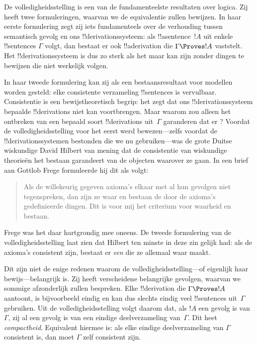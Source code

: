 \documentclass[../../../include/open-logic-section]{subfiles}
\begin{document}
      {}
      {}


De volledigheidsstelling is een van de fundamenteelste resultaten over
logica. Zij heeft twee formuleringen, waarvan we de equivalentie zullen
bewijzen. In haar eerste formulering zegt zij iets fundamenteels over
de verhouding tussen semantisch gevolg en ons !!{derivation}ssysteem:
als !!a{sentence}~$!A$ uit enkele !!{sentence}s $\Gamma$ volgt, dan
bestaat er ook !!a{derivation} die $\Gamma \Proves !A$ vaststelt. Het
!!{derivation}ssysteem is dus zo sterk als het maar kan zijn zonder
dingen te bewijzen die niet werkelijk volgen.

In haar tweede formulering kan zij als een bestaansresultaat voor
modellen worden gesteld: elke consistente verzameling !!{sentence}s is
vervulbaar. Consistentie is een bewijstheoretisch begrip: het zegt dat
ons !!{derivation}ssysteem bepaalde !!{derivation}s niet kan
voortbrengen. Maar waarom zou alleen het ontbreken van een bepaald
soort !!{derivation}s uit~$\Gamma$ garanderen dat er
? Voordat de
volledigheidsstelling voor het eerst werd bewezen---zelfs voordat de
!!{derivation}ssystemen bestonden die we nu gebruiken---was de grote
Duitse wiskundige David Hilbert van mening dat de consistentie van
wiskundige theorieën het bestaan garandeert van de objecten waarover
ze gaan. In een brief aan Gottlob Frege formuleerde hij dit als volgt:
\begin{quote}
  Als de willekeurig gegeven axioma's elkaar met al hun gevolgen niet
  tegenspreken, dan zijn ze waar en bestaan de door de axioma's
  gedefinieerde dingen. Dit is voor mij het criterium voor waarheid en
  bestaan.
\end{quote}
Frege was het daar hartgrondig mee oneens. De tweede formulering van de
volledigheidsstelling laat zien dat Hilbert ten minste in deze zin
gelijk had: als de axioma's consistent zijn, bestaat er \emph{een}
 die ze allemaal waar maakt.

Dit zijn niet de enige redenen waarom de volledigheidsstelling---of
eigenlijk haar bewijs---belangrijk is. Zij heeft verscheidene
belangrijke gevolgen, waarvan we sommige afzonderlijk zullen
bespreken. Elke !!{derivation} die $\Gamma \Proves !A$ aantoont, is
bijvoorbeeld eindig en kan dus slechts eindig veel !!{sentence}s
uit~$\Gamma$ gebruiken. Uit de volledigheidsstelling volgt daarom dat,
als $!A$ een gevolg is van~$\Gamma$, zij al een gevolg is van een
eindige deelverzameling van~$\Gamma$. Dit heet \emph{compactheid}.
Equivalent hiermee is: als elke eindige deelverzameling van $\Gamma$
consistent is, dan moet $\Gamma$ zelf consistent zijn.
\end{document}
